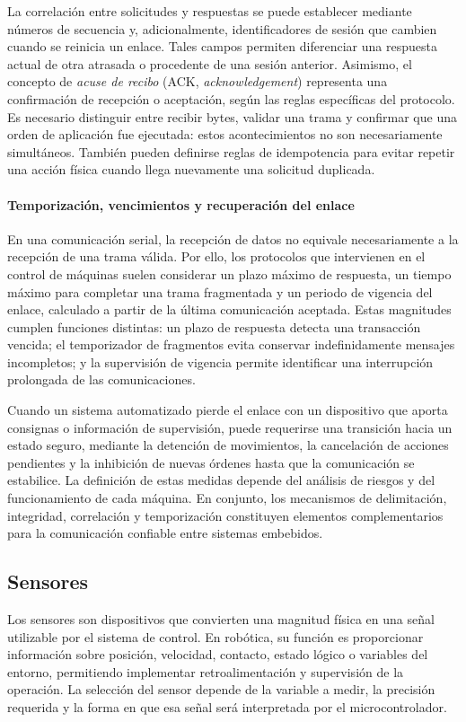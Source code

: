 La correlación entre solicitudes y respuestas se puede establecer mediante números de secuencia y, adicionalmente, identificadores de sesión que cambien cuando se reinicia un enlace. Tales campos permiten diferenciar una respuesta actual de otra atrasada o procedente de una sesión anterior. Asimismo, el concepto de \textit{acuse de recibo} (ACK, \textit{acknowledgement}) representa una confirmación de recepción o aceptación, según las reglas específicas del protocolo. Es necesario distinguir entre recibir bytes, validar una trama y confirmar que una orden de aplicación fue ejecutada: estos acontecimientos no son necesariamente simultáneos. También pueden definirse reglas de idempotencia para evitar repetir una acción física cuando llega nuevamente una solicitud duplicada.

\paragraph{Temporización, vencimientos y recuperación del enlace}
En una comunicación serial, la recepción de datos no equivale necesariamente a la recepción de una trama válida. Por ello, los protocolos que intervienen en el control de máquinas suelen considerar un plazo máximo de respuesta, un tiempo máximo para completar una trama fragmentada y un periodo de vigencia del enlace, calculado a partir de la última comunicación aceptada. Estas magnitudes cumplen funciones distintas: un plazo de respuesta detecta una transacción vencida; el temporizador de fragmentos evita conservar indefinidamente mensajes incompletos; y la supervisión de vigencia permite identificar una interrupción prolongada de las comunicaciones.

Cuando un sistema automatizado pierde el enlace con un dispositivo que aporta consignas o información de supervisión, puede requerirse una transición hacia un estado seguro, mediante la detención de movimientos, la cancelación de acciones pendientes y la inhibición de nuevas órdenes hasta que la comunicación se estabilice. La definición de estas medidas depende del análisis de riesgos y del funcionamiento de cada máquina. En conjunto, los mecanismos de delimitación, integridad, correlación y temporización constituyen elementos complementarios para la comunicación confiable entre sistemas embebidos.

\subsection{Sensores}
Los sensores son dispositivos que convierten una magnitud física en una señal utilizable por el sistema de control. En robótica, su función es proporcionar información sobre posición, velocidad, contacto, estado lógico o variables del entorno, permitiendo implementar retroalimentación y supervisión de la operación. La selección del sensor depende de la variable a medir, la precisión requerida y la forma en que esa señal será interpretada por el microcontrolador.

